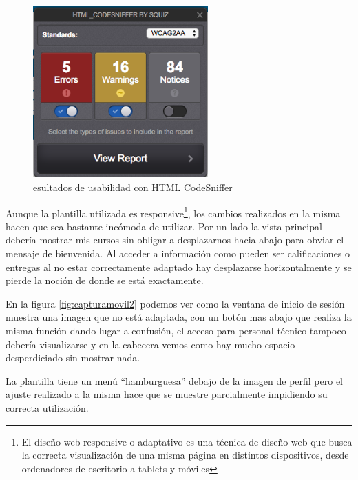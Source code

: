 \begin{figure}[H]
\centering
\includegraphics[width=0.6\textwidth]{../screenshots/htmlcodesniffer}
\caption{esultados de usabilidad con HTML CodeSniffer}
\label{fig:htmlcodesniffer}
\end{figure}


\bigskip
Aunque la plantilla utilizada es responsive\footnote{El diseño web responsive o adaptativo es una técnica de diseño web que busca la correcta visualización de una misma página en distintos dispositivos, desde ordenadores de escritorio a tablets y móviles}, los cambios realizados en la misma hacen que sea bastante incómoda de utilizar. Por un lado la vista principal debería mostrar mis cursos sin obligar a desplazarnos hacia abajo para obviar el mensaje de bienvenida. Al acceder a información como pueden ser calificaciones o entregas al no estar correctamente adaptado hay desplazarse horizontalmente y se pierde la noción de donde se está exactamente.

\bigskip
En la figura \ref{fig:capturamovil2} podemos ver como la ventana de inicio de sesión muestra una imagen que no está adaptada, con un botón mas abajo que realiza la misma función dando lugar a confusión, el acceso para personal técnico tampoco debería visualizarse y en la cabecera vemos como hay mucho espacio desperdiciado sin mostrar nada.

\bigskip
La plantilla tiene un menú ``hamburguesa'' debajo de la imagen de perfil pero el ajuste realizado a la misma hace que se muestre parcialmente impidiendo su correcta utilización.


